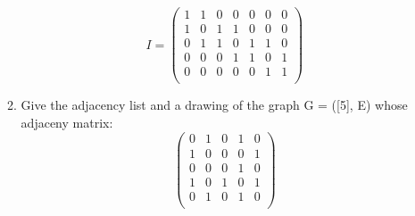 \documentclass[a3paper,12pt]{extarticle} %
\begin{document}
\begin{enumerate}
\begin{enumerate}
    \[
    I = \begin{pmatrix}
    1 & 1 & 0 & 0 & 0 & 0 & 0 \\
    1 & 0 & 1 & 1 & 0 & 0 & 0 \\
    0 & 1 & 1 & 0 & 1 & 1 & 0 \\
    0 & 0 & 0 & 1 & 1 & 0 & 1 \\
    0 & 0 & 0 & 0 & 0 & 1 & 1 \\
    \end{pmatrix}
    \]
    \item Give the adjacency list and a drawing of the graph G = ([5], E) whose adjaceny matrix:
    \[ 
    \begin{pmatrix}
        0 & 1 & 0 & 1 & 0 \\
        1 & 0 & 0 & 0 & 1 \\
        0 & 0 & 0 & 1 & 0 \\
        1 & 0 & 1 & 0 & 1 \\
        0 & 1 & 0 & 1 & 0 \\
    \end{pmatrix}
    \]
    \end{enumerate}
\end{enumerate}
\end{document}

